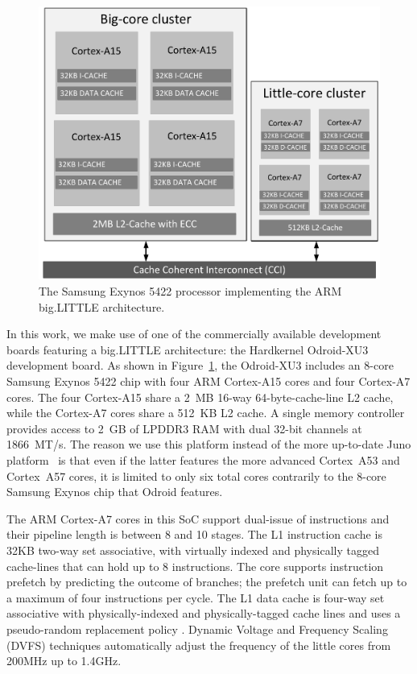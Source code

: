 \begin{figure}[t]
        \centering
        \includegraphics[width=\columnwidth]{figures/block_diagram.pdf}%
        \caption{The Samsung Exynos 5422 processor implementing the ARM big.LITTLE architecture.}%
        \label{fig:big-little-diagram}%
        \vspace{-0.4cm}
\end{figure}

In this work, we make use of one of the commercially available development boards featuring a big.LITTLE architecture: the Hardkernel Odroid-XU3 development board. As shown in Figure~\ref{fig:big-little-diagram}, the Odroid-XU3 includes an 8-core Samsung Exynos 5422 chip with four ARM Cortex-A15 cores and four Cortex-A7 cores. The four Cortex-A15 share a 2~MB 16-way 64-byte-cache-line L2 cache, while the Cortex-A7 cores share a 512~KB L2 cache. A single memory controller provides access to 2~GB of LPDDR3 RAM with dual 32-bit channels at 1866~MT/s. The reason we use this platform instead of the more up-to-date Juno platform~\cite{Juno} is that even if the latter features the more advanced Cortex~A53 and Cortex~A57 cores, it is limited to only six total cores contrarily to the 8-core Samsung Exynos chip that Odroid features.


The ARM Cortex-A7 cores in this SoC support dual-issue of instructions and their pipeline length is between 8 and 10 stages. The L1 instruction cache is 32KB two-way set associative, with virtually indexed and physically tagged cache-lines that can hold up to 8 instructions. The core supports instruction prefetch by predicting the outcome of branches; the prefetch unit can fetch up to a maximum of four instructions per cycle. The L1 data cache is four-way set associative with physically-indexed and physically-tagged cache lines and uses a pseudo-random replacement policy \cite{TRM_A7}. Dynamic Voltage and Frequency Scaling (DVFS) techniques automatically adjust the frequency of the little cores from 200MHz up to 1.4GHz.

